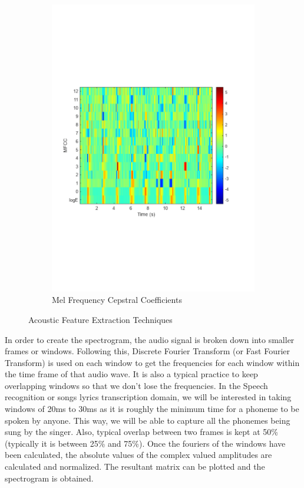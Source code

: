 \begin{figure}
\begin{subfigure}[b]{0.48\textwidth}
         \includegraphics[width=\textwidth]{02-fundamentals/figures/mfcc_matlab.pdf}
         \caption{Mel Frequency Cepstral Coefficients}
         \label{fig:mfcc}
     \end{subfigure}
     \hfill
        \caption{Acoustic Feature Extraction Techniques}
        \label{fig:acoustic_feature_extract}
\end{figure}

In order to create the spectrogram, the audio signal is broken down into smaller frames or windows. Following this, Discrete Fourier Transform (or Fast Fourier Transform) is used on each window to get the frequencies for each window within the time frame of that audio wave. It is also a typical practice to keep overlapping windows so that we don't lose the frequencies. In the Speech recognition or songs lyrics transcription domain, we will be interested in taking windows of 20ms to 30ms as it is roughly the minimum time for a phoneme to be spoken by anyone. This way, we will be able to capture all the phonemes being sung by the singer. Also, typical overlap between two frames is kept at 50\% (typically it is between 25\% and 75\%). Once the fouriers of the windows have been calculated, the absolute values of the complex valued amplitudes are calculated and normalized. The resultant matrix can be plotted and the spectrogram is obtained. 

